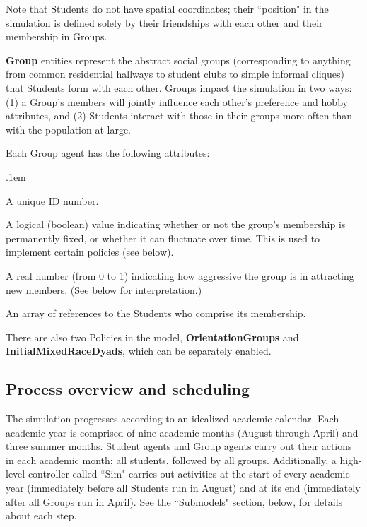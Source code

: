 Note that Students do not have spatial coordinates; their ``position" in the
simulation is defined solely by their friendships with each other and their
membership in Groups.

\vspace{.2in}

\textbf{Group} entities represent the abstract social groups (corresponding to
anything from common residential hallways to student clubs to simple informal
cliques) that Students form with each other. Groups impact the simulation in
two ways: (1) a Group's members will jointly influence each other's preference
and hobby attributes, and (2) Students interact with those in their groups
more often than with the population at large.

\vspace{.1in}
Each Group agent has the following attributes:

\begin{description}
\itemsep.1em

\item[ID] A unique ID number.

\item[IsFixed] A logical (boolean) value indicating whether or not the
group's membership is permanently fixed, or whether it can
fluctuate over time. This is used to implement certain policies (see below).

\item[RecruitmentFactor] A real number (from 0 to 1) indicating how
aggressive the group is in attracting new members. (See below for
interpretation.)

\item[Members] An array of references to the Students who comprise its
membership.

\end{description}

There are also two Policies in the model, \textbf{OrientationGroups} and
\textbf{InitialMixedRaceDyads}, which can be separately enabled.




\subsection{Process overview and scheduling}

The simulation progresses according to an idealized academic calendar. Each
academic year is comprised of nine academic months (August through April) and
three summer months. Student agents and Group agents carry out their actions
in each academic month: all students, followed by all groups. Additionally, a
high-level controller called ``Sim" carries out activities at the start of
every academic year (immediately before all Students run in August) and at its
end (immediately after all Groups run in April). See the ``Submodels" section,
below, for details about each step.


